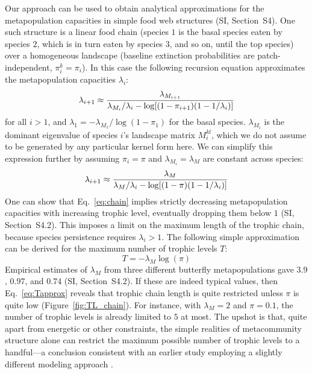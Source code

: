 \documentclass[11pt]{article}
\newcommand{\SI}{SI}
\let\originalleft\left
\let\originalright\right
\renewcommand{\left}{\mathopen{}\mathclose\bgroup\originalleft}
\renewcommand{\right}{\aftergroup\egroup\originalright}
\begin{document}
Our approach can be used to obtain analytical approximations for the metapopulation capacities in simple food web structures (\SI, Section~S4). One such structure is a linear food chain (species $1$ is the basal species eaten by species $2$, which is in turn eaten by species $3$, and so on, until the top species) over a homogeneous landscape (baseline extinction probabilities are patch-independent, $\pi_i^k = \pi_i$). In this case the following recursion equation approximates the metapopulation capacities $\lambda_i$:
\begin{equation}
  \label{eq:chain_full}
  \lambda_{i+1} \approx \frac{\lambda_{M_{i+1}}}{\lambda_{M_i} / \lambda_i
    - \log \left[ (1 - \pi_{i+1}) (1-1/\lambda_i) \right]}
\end{equation}
for all $i > 1$, and $\lambda_1 = -\lambda_{M_1} / \log(1-\pi_1)$ for the basal species. $\lambda_{M_{i}}$ is the dominant eigenvalue of species $i$'s landscape matrix $M_i^{kl}$, which we do not assume to be generated by any particular kernel form here. We can simplify this expression further by assuming $\pi_i = \pi$ and $\lambda_{M_i} = \lambda_M$ are constant across species:
\begin{equation}
  \label{eq:chain}
  \lambda_{i+1} \approx \frac{\lambda_M}{\lambda_M / \lambda_i
    - \log \left[ (1 - \pi) (1-1/\lambda_i) \right]}
\end{equation}
One can show that Eq.~\ref{eq:chain} implies strictly decreasing metapopulation capacities with increasing trophic level, eventually dropping them below $1$ (\SI, Section~S4.2). This imposes a limit on the maximum length of the trophic chain, because species persistence requires $\lambda_i > 1$. The following simple approximation can be derived for the maximum number of trophic levels $T$:
\begin{equation}
  \label{eq:Tapprox}
  T = -\lambda_M \log(\pi)
\end{equation}
Empirical estimates of $\lambda_M$ from three different butterfly metapopulations \citep{Hanski1994} gave $3.9$, $0.97$, and $0.74$ (\SI, Section~S4.2). If these are indeed typical values, then Eq.~\ref{eq:Tapprox} reveals that trophic chain length is quite restricted unless $\pi$ is quite low (Figure~\ref{fig:TL_chain}). For instance, with $\lambda_M=2$ and $\pi=0.1$, the number of trophic levels is already limited to $5$ at most. The upshot is that, quite apart from energetic or other constraints, the simple realities of metacommunity structure alone can restrict the maximum possible number of trophic levels to a handful---a conclusion consistent with an earlier study employing a slightly different modeling approach \citep{Calcagnoetal2011}.
\end{document}
